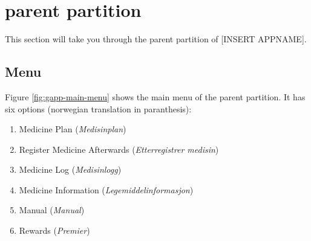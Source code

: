 % 	
% 	





\section{parent partition}
This section will take you through the parent partition of [INSERT APPNAME].

\subsection{Menu}
\label{sec:description-menu}
Figure \ref{fig:gapp-main-menu} shows the main menu of the parent partition. It has six options (norwegian translation in paranthesis):
\begin{enumerate}
  \item Medicine Plan (\emph{Medisinplan})
  \item Register Medicine Afterwards (\emph{Etterregistrer medisin})
  \item Medicine Log (\emph{Medisinlogg})
  \item Medicine Information (\emph{Legemiddelinformasjon})
  \item Manual (\emph{Manual})
  \item Rewards (\emph{Premier})
\end{enumerate} 


